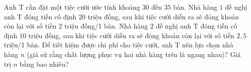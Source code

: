 \begin{ex}
Anh T cần đặt một tiệc cưới ước tính khoảng $30$ đến $35$ bàn. Nhà hàng $1$ đề nghị anh T đóng tiền cố định $20$ triệu đồng, sau khi tiệc cưới diễn ra sẽ đóng khoản còn lại với số tiền $2$ triệu đồng/1 bàn. Nhà hàng $2$ đề nghị anh T đóng tiền cố định $10$ triệu đồng, sau khi tiệc cưới diễn ra sẽ đóng khoản còn lại với số tiền $2{,}5$ triệu/1 bàn. Để tiết kiệm được chi phí cho tiệc cưới, anh T nên lựa chọn nhà hàng $n$ (giả sử rằng chất lượng phục vụ hai nhà hàng trên là ngang nhau)? Giá trị $n$ bằng bao nhiêu?
\end{ex}
